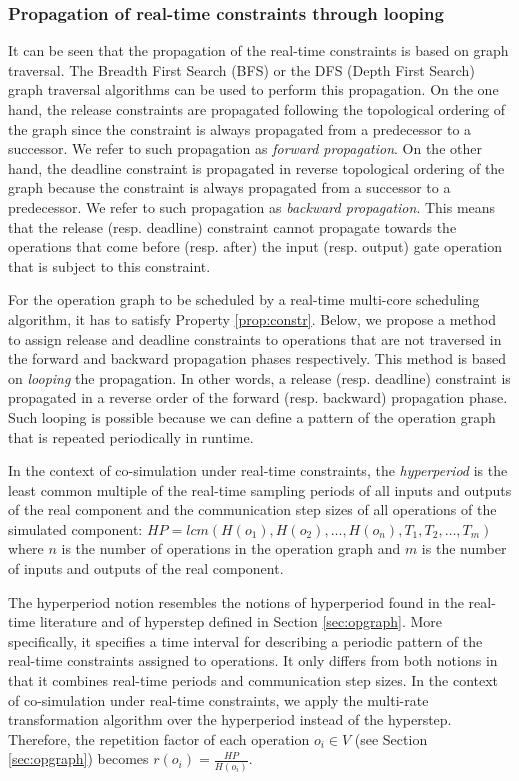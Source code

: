 \subsubsection{Propagation of real-time constraints through looping}

It can be seen that the propagation of the real-time constraints is based on graph traversal. The Breadth First Search (BFS) or the DFS (Depth First Search) graph traversal algorithms can be used to perform this propagation. On the one hand, the release constraints are propagated following the topological ordering of the graph since the constraint is always propagated from a predecessor to a successor. We refer to such propagation as \textit{forward propagation}. On the other hand, the deadline constraint is propagated in reverse topological ordering of the graph because the constraint is always propagated from a successor to a predecessor. We refer to such propagation as \textit{backward propagation}. This means that the release (resp. deadline) constraint cannot propagate towards the operations that come before (resp. after) the input (resp. output) gate operation that is subject to this constraint.

For the operation graph to be scheduled by a real-time multi-core scheduling algorithm, it has to satisfy Property \ref{prop:constr}. Below, we propose a method to assign release and deadline constraints to operations that are not traversed in the forward and backward propagation phases respectively. This method is based on \textit{looping} the propagation. In other words, a release (resp. deadline) constraint is propagated in a reverse order of the forward (resp. backward) propagation phase. Such looping is possible because we can define a pattern of the operation graph that is repeated periodically in runtime.

\begin{definition}
In the context of co-simulation under real-time constraints, the \textit{hyperperiod} is the least common multiple of the real-time sampling periods of all inputs and outputs of the real component and the communication step sizes of all operations of the simulated component: $HP=lcm(H(o_1),H(o_2), \dots ,\allowbreak H(o_n), T_1, T_2, \dots ,T_m)$ where $n$ is the number of operations in the operation graph and $m$ is the number of inputs and outputs of the real component.
\label{def:hyperperiod}
\end{definition}

The hyperperiod notion resembles the notions of hyperperiod found in the real-time literature and of hyperstep defined in Section \ref{sec:opgraph}. More specifically, it specifies a time interval for describing a periodic pattern of the real-time constraints assigned to operations. It only differs from both notions in that it combines real-time periods and communication step sizes. In the context of co-simulation under real-time constraints, we apply the multi-rate transformation algorithm over the hyperperiod instead of the hyperstep. Therefore, the repetition factor of each operation $o_i \in V$ (see Section \ref{sec:opgraph}) becomes $r(o_i) = \frac{HP}{H(o_i)}$.

